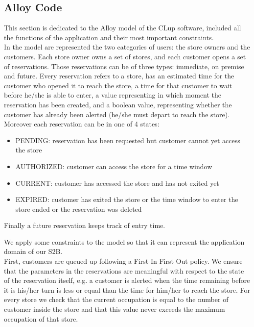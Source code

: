\subsection{Alloy Code}
This section is dedicated to the Alloy model of the CLup  software, included all the functions of the application and their most important constraints.\\
In the model are represented the two categories of users: the store owners and the customers. Each store owner owns a set of stores, and each customer opens a set of reservations. Those reservations can be of three types: immediate, on premise and future. Every reservation refers to a store, has an estimated time for the customer who opened it to reach the store, a time for that customer to wait before he/she is able to enter, a value representing in which moment the reservation has been created, and a boolean value, representing whether the customer has already been alerted (he/she must depart to reach the store). Moreover each reservation can be in one of 4 states:
\begin{itemize}
	\item PENDING: reservation has been requested but customer cannot yet access the store
	\item AUTHORIZED: customer can access the store for a time window
	\item CURRENT: customer has accessed the store and has not exited yet
	\item EXPIRED: customer has exited the store or the time window to enter the store ended or the reservation was deleted
\end{itemize}
Finally a future reservation keeps track of entry time.

We apply some constraints to the model so that it can represent the application domain of our S2B.\\
First, customers are queued up following a First In First Out policy. We ensure that the parameters in the reservations are meaningful with respect to the state of the reservation itself, e.g. a customer is alerted when the time remaining before it is his/her turn is less or equal than the time for him/her to reach the store. For every store we check that the current occupation is equal to the number of customer inside the store and that this value never exceeds the maximum occupation of that store.

\newpage
